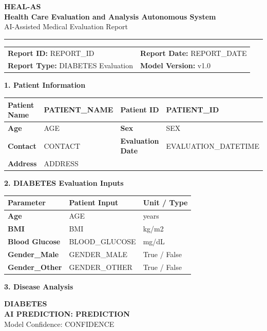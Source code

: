\documentclass[11pt,a4paper]{article}
\newcommand{\sectiontitle}[1]{\vspace{8pt}\noindent\colorbox{HealBlue}{\parbox{\dimexpr\linewidth-2\fboxsep}{\color{white}\textbf{\large #1}}}\vspace{5pt}}
\begin{document}
\begin{center}
{\Huge\textbf{\color{HealBlue}HEAL-AS}}\\[3pt]
{\large\textbf{Health Care Evaluation and Analysis Autonomous System}}\\[3pt]
{\small AI-Assisted Medical Evaluation Report}\\[6pt]
\rule{\linewidth}{1pt}
\end{center}
\begin{tabularx}{\linewidth}{X X}
\textbf{Report ID:} {{REPORT_ID}} & \textbf{Report Date:} {{REPORT_DATE}}\\
\textbf{Report Type:} DIABETES Evaluation & \textbf{Model Version:} v1.0
\end{tabularx}

\sectiontitle{1. Patient Information}
\begin{tabularx}{\linewidth}{|l|X|l|X|}
\hline
\textbf{Patient Name} & {{PATIENT_NAME}} & \textbf{Patient ID} & {{PATIENT_ID}} \\ \hline
\textbf{Age} & {{AGE}} & \textbf{Sex} & {{SEX}} \\ \hline
\textbf{Contact} & {{CONTACT}} & \textbf{Evaluation Date} & {{EVALUATION_DATETIME}} \\ \hline
\textbf{Address} & \multicolumn{3}{l|}{{ADDRESS}} \\ \hline
\end{tabularx}

\sectiontitle{2. DIABETES Evaluation Inputs}
\begin{tabularx}{\linewidth}{|X|X|X|}
\hline
\textbf{Parameter} & \textbf{Patient Input} & \textbf{Unit / Type}\\ \hline
\textbf{Age} & {{AGE}} & years\\ \hline
\textbf{BMI} & {{BMI}} & kg/m2\\ \hline
\textbf{Blood Glucose} & {{BLOOD_GLUCOSE}} & mg/dL\\ \hline
\textbf{Gender_Male} & {{GENDER_MALE}} & True / False\\ \hline
\textbf{Gender_Other} & {{GENDER_OTHER}} & True / False\\ \hline
\end{tabularx}

\sectiontitle{3. Disease Analysis}
\begin{tcolorbox}[colback=HealLight,colframe=HealBlue,halign=center]
{\Large\textbf{DIABETES}}\\[6pt]
{\Large\textbf{AI PREDICTION: {{PREDICTION}}}}\\[5pt]
Model Confidence: {{CONFIDENCE}}
\end{tcolorbox}
\end{document}
